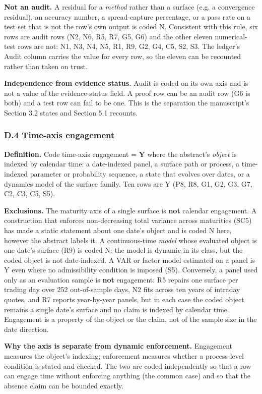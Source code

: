 \documentclass[11pt]{article}
\begin{document}
\textbf{Not an audit.} A residual for a \textit{method} rather than a surface (e.g. a convergence residual), an accuracy number, a spread-capture percentage, or a pass rate on a test set that is not the row's own output is coded N. Consistent with this rule, six rows are audit rows (N2, N6, R5, R7, G5, G6) and the other eleven numerical-test rows are not: N1, N3, N4, N5, R1, R9, G2, G4, C5, S2, S3. The ledger's Audit column carries the value for every row, so the eleven can be recounted rather than taken on trust.

\textbf{Independence from evidence status.} Audit is coded on its own axis and is not a value of the evidence-status field. A proof row can be an audit row (G6 is both) and a test row can fail to be one. This is the separation the manuscript's Section 3.2 states and Section 5.1 recounts.

\subsubsection*{D.4 Time-axis engagement}
\textbf{Definition.} Code time-axis engagement = \textbf{Y} where the abstract's \textit{object} is indexed by calendar time: a date-indexed panel, a surface path or process, a time-indexed parameter or probability sequence, a state that evolves over dates, or a dynamics model of the surface family. Ten rows are Y (P8, R8, G1, G2, G3, G7, C2, C3, C5, S5).

\textbf{Exclusions.} The maturity axis of a single surface is \textbf{not} calendar engagement. A construction that enforces non-decreasing total variance across maturities (SC5) has made a static statement about one date's object and is coded N here, however the abstract labels it. A continuous-time \textit{model} whose evaluated object is one date's surface (R9) is coded N: the model is dynamic in its class, but the coded object is not date-indexed. A VAR or factor model estimated on a panel is Y even where no admissibility condition is imposed (S5). Conversely, a panel used only as an evaluation sample is \textbf{not} engagement: R5 repairs one surface per trading day over 252 out-of-sample days, N2 fits across ten years of intraday quotes, and R7 reports year-by-year panels, but in each case the coded object remains a single date's surface and no claim is indexed by calendar time. Engagement is a property of the object or the claim, not of the sample size in the date direction.

\textbf{Why the axis is separate from dynamic enforcement.} Engagement measures the object's indexing; enforcement measures whether a process-level condition is stated and checked. The two are coded independently so that a row can engage time without enforcing anything (the common case) and so that the absence claim can be bounded exactly.
\end{document}
